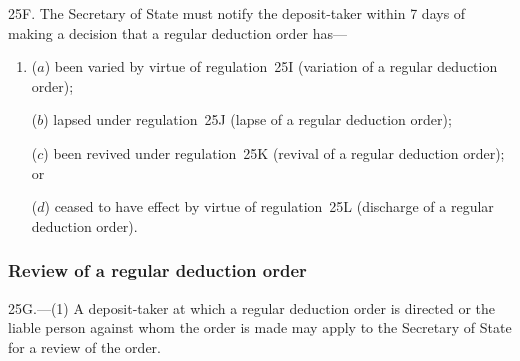 \documentclass[12pt,a4paper]{article}
\begin{document}
25F.  The 
Secretary of State  %
must notify the deposit-taker within 7 days of making a decision that a regular deduction order has—
\begin{enumerate}\item[]
($a$) been varied by virtue of regulation~25I (variation of a regular deduction order);

($b$) lapsed under regulation~25J (lapse of a regular deduction order);

($c$) been revived under regulation~25K (revival of a regular deduction order); or

($d$) ceased to have effect by virtue of regulation~25L (discharge of a regular deduction order).
\end{enumerate}


\subsubsection[25G. Review of a regular deduction order]{Review of a regular deduction order}

25G.---(1)  A deposit-taker at which a regular deduction order is directed or the liable person against whom the order is made may apply to the 
Secretary of State  %
for a review of the order.
\end{document}

